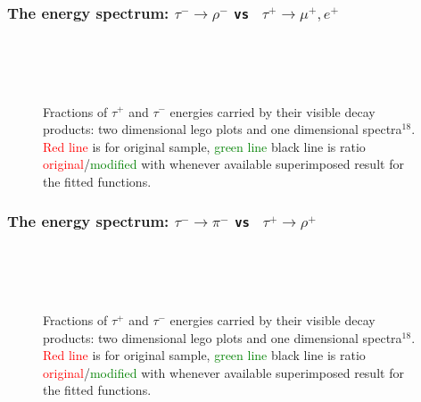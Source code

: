 \newpage
\subsubsection{The energy spectrum: $\tau^- \to \rho^-$ {\tt vs } $\tau^+ \to \mu^+, e^+$}
\vspace{3\baselineskip}

\begin{figure}[h!]
\centering
{}
 \\
 \\
 \\
\caption{\small Fractions of  $\tau^+$ and $\tau^-$ energies carried by their visible  decay products:
two dimensional lego plots and one dimensional spectra$^{18}$.
\textcolor{red}{Red line} is  for original sample,
\textcolor{green}{green line} \greenlineis
black line is ratio \textcolor{red}{original}/\textcolor{green}{modified} with whenever available superimposed result for the
fitted functions.
}
\end{figure}

\newpage
\subsubsection{The energy spectrum: $\tau^- \to \pi^-$ {\tt vs } $\tau^+ \to \rho^+$}
\vspace{3\baselineskip}

\begin{figure}[h!]
\centering
{}
 \\
 \\
 \\
\caption{\small Fractions of  $\tau^+$ and $\tau^-$ energies carried by their visible  decay products:
two dimensional lego plots and one dimensional spectra$^{18}$.
\textcolor{red}{Red line} is  for original sample,
\textcolor{green}{green line} \greenlineis
black line is ratio \textcolor{red}{original}/\textcolor{green}{modified} with whenever available superimposed result for the
fitted functions.
}
\end{figure}


